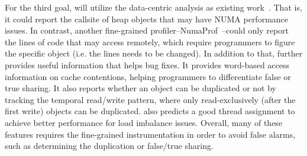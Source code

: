 
For the third goal, \NP{} will utilize the data-centric analysis as existing work~\cite{XuNuma}. That is, it could report the callsite of heap objects that may have NUMA performance issues. In contrast, another fine-grained profiler--NumaProf~\cite{valat:2018:numaprof}--could only report the lines of code that may access remotely, which require programmers to figure the specific object (i.e. the lines needs to be changed). In addition to that, \NP{} further provides useful information that helps bug fixes. It provides word-based access information on cache contentions, helping programmers to differentiate false or true sharing. It also reports whether an object can be duplicated or not by tracking the temporal read/write pattern, where only read-exclusively (after the first write) objects can be duplicated.  \NP{} also predicts a good thread assignment to achieve better performance for load imbalance issues. Overall, many of these features requires the fine-grained instrumentation in order to avoid false alarms, such as determining the duplication or false/true sharing. 



